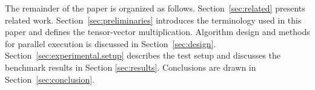 The remainder of the paper is organized as follows. 
Section~\ref{sec:related} presents related work.
Section~\ref{sec:preliminaries} introduces the terminology used in this paper and defines the tensor-vector multiplication.
Algorithm design and methods for parallel execution is discussed in Section~\ref{sec:design}.
Section~\ref{sec:experimental.setup} describes the test setup and discusses the benchmark results in Section \ref{sec:results}.
Conclusions are drawn in Section~\ref{sec:conclusion}.


\begin{comment}
In Introduction these are the claims and benefits:
\begin{itemize}
\item we propose recursive tensor vector multiplication algorithms that can process tensors with any rank, dimension extent and any linear layouts (including the first- and the last-order storage format) for any possible contraction mode (show algorithms).
\item while this might not possible for the general tensor-tensor multiplication, we show that the tensor-vector multiplication algorithms can be defined in terms of tensors and subtensors in terms of four and three general matrix vector multiplication configurations that is applicable for any kind of contraction mode and linear layout combination. This greatly simplifies the implementation of the tensor-vector multiplication. (show tables for tensor and subtensor)
\item We present a parallelization strategy with which the number of parallel executed matrix-vector multiplications is adjusted at runtime. In contrast to a simple parallelization over the most outer loop we show that our proposed strategy leads generally to a sustained bandwith.
\item Using about 2x10x360x120 tensor shape configurations the proposed algorithms provide a sustained throughput of 20 GB/s for any kind of contraction mode and linear layout combination. We show that our methodology simplifies the design and implementation of such a complicated operation without any matrification.
\item We are able to transform a Multi-Loop GEMV into a Single-Loop GEMV which can be fully parallelized with the parallel OpenMP.
\item We show parallelization strategies for both subtensor sizes without employing 
\item The analysis of tensor contraction is hard due to great design space. A tensor is parametrized in terms of order x dimensions x layout. Additionally, the contraction operation itself is highly variable: only for the class 2 operation with no free indices on the right-hand side you have contraction mode x ???. Understanding what blocking strategy is best is hard to find out   give an example from GETT-Paper that 'only' 50 examples of tensor contractions are considered. (by the way how does we have?, can we divide the analysis space into tensor parametrization and algorithm parametrization?)	

\end{comment}
